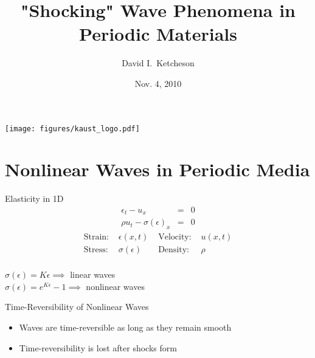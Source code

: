 \documentclass[xcolor=pst,dvipsnames]{beamer}
\title[]{"Shocking" Wave Phenomena in Periodic Materials}
\author[D. Ketcheson]{David I.~Ketcheson}
\date{Nov. 4, 2010}
\begin{document}


\begin{frame}
  \titlepage
  \begin{center} \texttt{[image: figures/kaust\_logo.pdf]} \end{center}
\end{frame}


\section{Nonlinear Waves in Periodic Media}

\begin{frame}{Elasticity in 1D}
\begin{eqnarray*}
\epsilon_t-u_x & = & 0 \\
\rho u_t - \sigma(\epsilon)_x & = & 0
\end{eqnarray*} \pause
\begin{align*}
\mbox{Strain:  } & \epsilon(x,t) & \mbox{ Velocity:  } & u(x,t) \\
\mbox{Stress:  } & \sigma(\epsilon) & \mbox{ Density:  } & \rho \\
\end{align*} \pause

\begin{center}
$\sigma(\epsilon)=K\epsilon \implies$ linear waves \\
$\sigma(\epsilon)=e^{K\epsilon}-1 \implies$ nonlinear waves
\end{center}
\end{frame}

\begin{frame}{Time-Reversibility of Nonlinear Waves}
\begin{center}  
 \end{center}
\begin{itemize}
  \item Waves are time-reversible as long as they remain smooth
  \item Time-reversibility is lost after shocks form
\end{itemize}
\end{frame}
\end{document}
